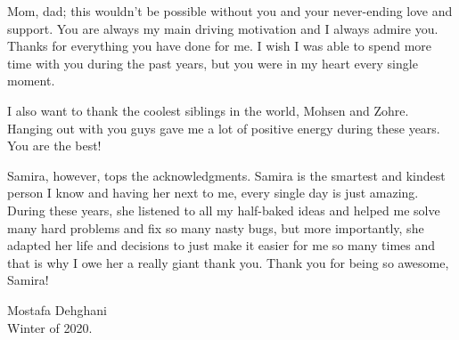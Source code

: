 Mom, dad; this wouldn't be possible without you and your never-ending love and support. You are always my main driving motivation and I always admire you. Thanks for everything you have done for me. I wish I was able to spend more time with you during the past years, but you were in my heart every single moment.

I also want to thank the coolest siblings in the world, Mohsen and Zohre. Hanging out with you guys gave me a lot of positive energy during these years. You are the best!

Samira, however, tops the acknowledgments. Samira is the smartest and kindest person I know and having her next to me, every single day is just amazing.  During these years, she listened to all my half-baked ideas and helped me solve many hard problems and fix so many nasty bugs, but more importantly, she adapted her life and decisions to just make it easier for me so many times and that is why I owe her a really giant thank you. Thank you for being so awesome, Samira!


\hfill 

Mostafa Dehghani\\
Winter of 2020.

\afterpage{\blankpage}